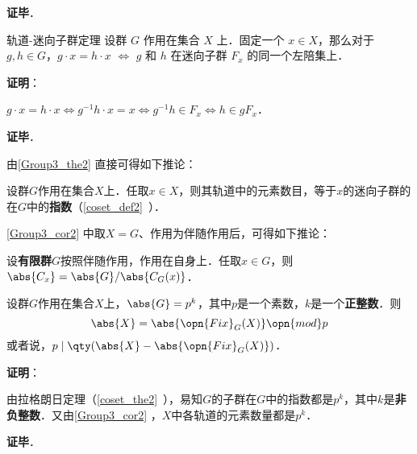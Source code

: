 \textbf{证毕}．




\begin{theorem}{轨道-迷向子群定理}\label{Group3_the2}
设群 $G$ 作用在集合 $X$ 上．固定一个 $x\in X$，那么对于 $g, h\in G$，$g\cdot x= h\cdot x$ $\iff$ $g$ 和 $h$ 在迷向子群 $F_x$ 的同一个左陪集上．
\end{theorem}

\textbf{证明}：

 $g\cdot x=h\cdot x\iff g^{-1}h\cdot x=x\iff g^{-1}h\in F_x\iff h\in gF_x$．

\textbf{证毕}．






由\autoref{Group3_the2} 直接可得如下推论：


\begin{corollary}{}\label{Group3_cor2}

设群$G$作用在集合$X$上．任取$x\in X$，则其轨道中的元素数目，等于$x$的迷向子群的在$G$中的\textbf{指数}（\autoref{coset_def2}~）．

\end{corollary}




\autoref{Group3_cor2} 中取$X=G$、作用为伴随作用后，可得如下推论：

\begin{corollary}{}\label{Group3_cor3}

设\textbf{有限群}$G$按照伴随作用，作用在自身上．任取$x\in G$，则$\abs{C_x}=\abs{G}/\abs{C_G(x)}$．

\end{corollary}




\begin{theorem}{}
设群$G$作用在集合$X$上，$\abs{G}=p^k$，其中$p$是一个素数，$k$是一个\textbf{正整数}．则
\begin{equation}
\abs{X} = \abs{\opn{Fix}_G(X)} \opn{mod} p
\end{equation}
或者说，$p\mid \qty(\abs{X}-\abs{\opn{Fix}_G(X)})$．
\end{theorem}

\textbf{证明}：

由拉格朗日定理（\autoref{coset_the2}~），易知$G$的子群在$G$中的指数都是$p^k$，其中$k$是\textbf{非负整数}．又由\autoref{Group3_cor2} ，$X$中各轨道的元素数量都是$p^k$．

\textbf{证毕}．









